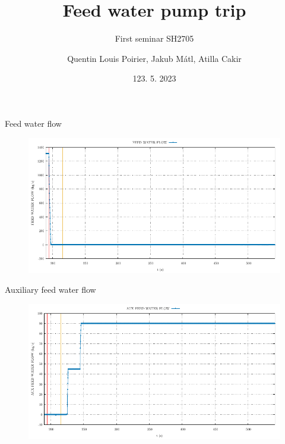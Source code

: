 

\title[APROS simulations of BWR transients]{Feed water pump trip}
\subtitle{First seminar SH2705}
\author{Quentin Louis Poirier, Jakub Mátl, Atilla Cakir}
\date[24/05/23]{123. 5. 2023}
\usepackage{comment}

\usepackage[style=authoryear-ibid,backend=biber]{biblatex}
\usepackage{pgfplots}
\pgfplotsset{compat=1.18}



\nologo %




\frame{\titlepage}

\begin{frame}{Feed water flow}
	\begin{figure}
		\centering
		\includegraphics[width=\textwidth]{./graphs/FEED WATER FLOW_comp.pdf}
		
	\end{figure}
	
\end{frame}

\begin{frame}{Auxiliary feed water flow}
	\begin{figure}
		\centering
		\includegraphics[width=\textwidth]{./graphs/AUX FEED WATER FLOW_comp.pdf}
		
	\end{figure}
	
\end{frame}


